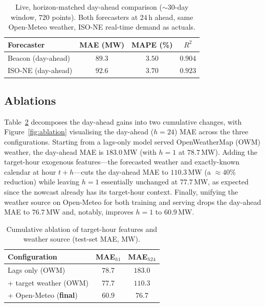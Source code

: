 \begin{table}[t]
\centering
\caption{Live, horizon-matched day-ahead comparison ($\sim$30-day window,
$720$ points). Both forecasters at $24$\,h ahead, same Open-Meteo weather,
ISO-NE real-time demand as actuals.}
\label{tab:iso}
\begin{tabular}{lccc}
\toprule
Forecaster & MAE (MW) & MAPE (\%) & $R^2$ \\
\midrule
Beacon (day-ahead) & $\mathbf{89.3}$ & $\mathbf{3.50}$ & $0.904$ \\
ISO-NE (day-ahead)  & $92.6$ & $3.70$ & $\mathbf{0.923}$ \\
\bottomrule
\end{tabular}
\end{table}

\subsection{Ablations}
Table~\ref{tab:ablation} decomposes the day-ahead gains into two cumulative
changes, with Figure~\ref{fig:ablation} visualising the day-ahead ($h=24$) MAE
across the three configurations. Starting from a lags-only model served
OpenWeatherMap (OWM) weather, the day-ahead MAE is $183.0$\,MW (with $h=1$ at
$78.7$\,MW). Adding the target-hour exogenous features---the forecasted weather
and exactly-known calendar at hour $t+h$---cuts the day-ahead MAE to $110.3$\,MW
(a $\approx 40\%$ reduction) while leaving $h=1$ essentially unchanged at
$77.7$\,MW, as expected since the nowcast already has its target-hour context.
Finally, unifying the weather source on Open-Meteo for both training and serving
drops the day-ahead MAE to $76.7$\,MW and, notably, improves $h=1$ to $60.9$\,MW.

\begin{table}[t]
\centering
\caption{Cumulative ablation of target-hour features and weather source
(test-set MAE, MW).}
\label{tab:ablation}
\setlength{\tabcolsep}{4pt}
\begin{tabular}{lcc}
\toprule
Configuration & MAE$_{h1}$ & MAE$_{h24}$ \\
\midrule
Lags only (OWM) & $78.7$ & $183.0$ \\
\;+ target weather (OWM) & $77.7$ & $110.3$ \\
\;+ Open-Meteo (\textbf{final}) & $\mathbf{60.9}$ & $\mathbf{76.7}$ \\
\bottomrule
\end{tabular}
\end{table}

